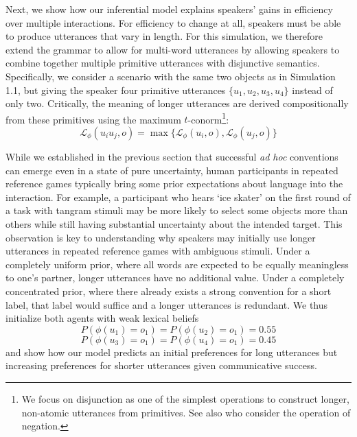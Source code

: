Next, we show how our inferential model explains speakers' gains in efficiency over multiple interactions. 
For efficiency to change at all, speakers must be able to produce utterances that vary in length. 
For this simulation, we therefore extend the grammar to allow for multi-word utterances by allowing speakers to combine together multiple primitive utterances with disjunctive semantics.
Specifically, we consider a scenario with the same two objects as in Simulation 1.1, but giving the speaker four primitive utterances $\{u_1, u_2, u_3, u_4\}$ instead of only two. 
Critically, the meaning of longer utterances are derived compositionally from these primitives using the maximum $t$-conorm\footnote{We focus on disjunction as one of the simplest operations to construct longer, non-atomic utterances from primitives. See also  who consider the operation of negation.}:
$$\mathcal{L}_\phi(u_iu_j, o) = \max\{\mathcal{L}_\phi(u_i, o) , \mathcal{L}_\phi(u_j, o)\}$$

While we established in the previous section that successful \emph{ad hoc} conventions can emerge even in a state of pure uncertainty, human participants in repeated reference games typically bring some prior expectations about language into the interaction.
For example, a participant who hears `ice skater' on the first round of a task with tangram stimuli may be more likely to select some objects more than others while still having substantial uncertainty about the intended target.
This observation is key to understanding why speakers may initially use longer utterances in repeated reference games with ambiguous stimuli. 
Under a completely uniform prior, where all words are expected to be equally meaningless to one's partner, longer utterances have no additional value. 
Under a completely concentrated prior, where there already exists a strong convention for a short label, that label would suffice and a longer utterances is redundant.
We thus initialize both agents with weak lexical beliefs
$$P(\phi(u_1) = o_1) = P(\phi(u_2) = o_1) = 0.55$$ 
$$P(\phi(u_3) = o_1) = P(\phi(u_4) = o_1) = 0.45$$
and show how our model predicts an initial preferences for long utterances but increasing preferences for shorter utterances given communicative success.

